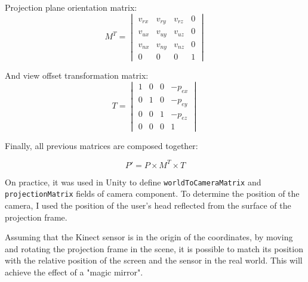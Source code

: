 \documentclass[a4paper]{report}
\begin{document}
        Projection plane orientation matrix:
        \[ M^T =
        \begin{vmatrix}
            v_{rx} & v_{ry} & v_{rz} & 0\\
            v_{ux} & v_{uy} & v_{uz} & 0\\
            v_{nx} & v_{ny} & v_{nz} & 0\\
            0      & 0      & 0      & 1
        \end{vmatrix}
        \]
        
        And view offset transformation matrix:
        \[ T =
        \begin{vmatrix}
            1 & 0 & 0 & -p_{ex}\\
            0 & 1 & 0 & -p_{ey}\\
            0 & 0 & 1 & -p_{ez}\\
            0 & 0 & 0 & 1
        \end{vmatrix}
        \]
        
        
        Finally, all previous matrices are composed together:
        
        \[
            P' = P \times M^T \times T
        \]
        
        
    On practice, it was used in Unity to define \verb|worldToCameraMatrix| and \verb|projectionMatrix| fields of camera component. To determine the position of the camera, I used the position of the user's head reflected from the surface of the projection frame.
    
    Assuming that the Kinect sensor is in the origin of the coordinates, by moving and rotating the projection frame in the scene, it is possible to match its position with the relative position of the screen and the sensor in the real world. This will achieve the effect of a "magic mirror".

        
        
\end{document}
